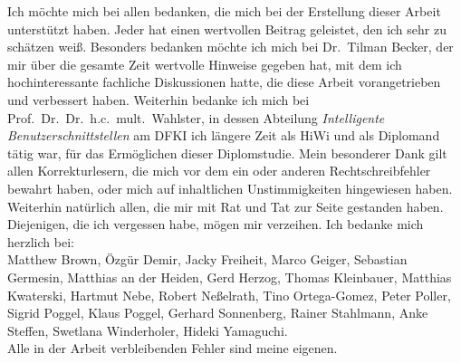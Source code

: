 Ich möchte mich bei allen bedanken, die mich bei der Erstellung dieser Arbeit 
unterstützt haben. Jeder hat einen wertvollen Beitrag geleistet, 
den ich sehr zu schätzen weiß. Besonders bedanken möchte ich mich bei 
Dr.~Tilman Becker, der mir über die gesamte Zeit wertvolle Hinweise gegeben hat, mit dem ich 
hochinteressante fachliche Diskussionen hatte, die diese Arbeit vorangetrieben
und verbessert haben. Weiterhin bedanke ich mich bei Prof.~Dr.~Dr.~h.c.~mult.~Wahlster, 
in dessen Abteilung \emph{Intelligente Benutzerschnittstellen} am DFKI ich längere Zeit als HiWi 
und als Diplomand tätig war, für das Ermöglichen dieser Diplomstudie.
Mein besonderer Dank gilt allen Korrekturlesern, die mich vor dem ein oder anderen
Rechtschreibfehler bewahrt haben, oder mich auf inhaltlichen Unstimmigkeiten hingewiesen haben.
Weiterhin natürlich allen, die mir mit Rat und Tat zur Seite gestanden haben. 
Diejenigen, die ich vergessen habe, mögen mir verzeihen.
Ich bedanke mich herzlich bei:\\
Matthew Brown,
Özgür Demir,
Jacky Freiheit,
Marco Geiger,
Sebastian Germesin,
Matthias an der Heiden,
Gerd Herzog,
Thomas Kleinbauer,
Matthias Kwaterski, 
Hartmut Nebe,
Robert Neßelrath,
Tino Ortega-Gomez,
Peter Poller,
Sigrid Poggel,
Klaus Poggel,
Gerhard Sonnenberg,
Rainer Stahlmann,
Anke Steffen,
Swetlana Winderholer,
Hideki Yamaguchi.  \\
Alle in der Arbeit verbleibenden Fehler sind meine eigenen.
